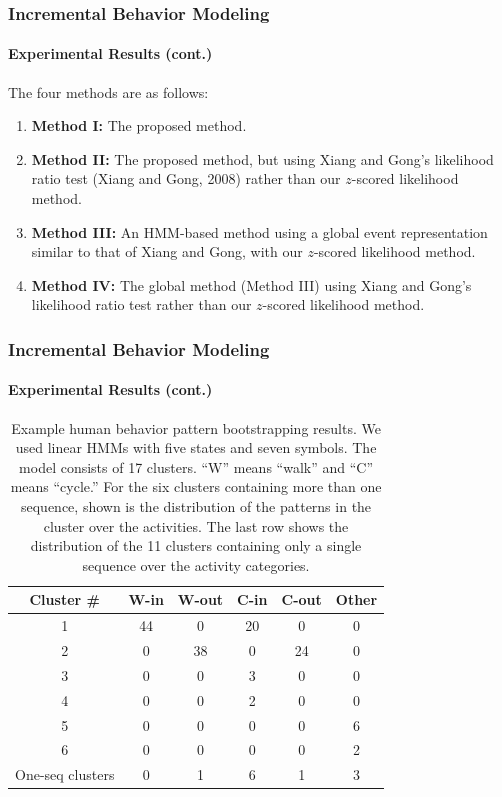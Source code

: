 \begin{frame}
    \frametitle{Incremental Behavior Modeling}
    \framesubtitle{Experimental Results (cont.)}
    
    The four methods are as follows:
    \begin{enumerate}
        \item {\bf Method I:} The proposed method.
        \item {\bf Method II:} The proposed method, but using Xiang and Gong's
            likelihood ratio test (Xiang and Gong, 2008)
            rather than our $z$-scored likelihood method.
        \item {\bf Method III:} An HMM-based method using a global event
            representation similar to that of Xiang and Gong, with our
            $z$-scored likelihood method.
        \item {\bf Method IV:} The global method (Method III) using Xiang and
            Gong's likelihood ratio test rather than our $z$-scored likelihood
            method.
    \end{enumerate}

\end{frame}


\begin{frame}
    \frametitle{Incremental Behavior Modeling}
    \framesubtitle{Experimental Results (cont.)}
    
    \begin{table}
        \caption{Example human behavior pattern bootstrapping
            results. We used linear HMMs with five states and seven
            symbols. The model consists of 17 clusters. ``W'' means ``walk''
            and ``C'' means ``cycle.'' For the six clusters containing more
            than one sequence, shown is the distribution of the patterns in
            the cluster over the activities.  The last row shows the
            distribution of the 11 clusters containing only a single sequence
            over the activity categories.}
        \centering
        \begin{tabular}{c|c|c|c|c|c}
            \hline
            Cluster \# & W-in & W-out & C-in & C-out & Other \\
            \hline \hline
            1 & 44 & 0  & 20 & 0  & 0 \\ \hline
            2 & 0  & 38 & 0  & 24 & 0 \\ \hline
            3 & 0  & 0  & 3  & 0  & 0 \\ \hline
            4 & 0  & 0  & 2  & 0  & 0 \\ \hline
            5 & 0  & 0  & 0  & 0  & 6 \\ \hline
            6 & 0  & 0  & 0  & 0  & 2 \\ \hline
            One-seq clusters & 0 & 1 & 6 & 1 & 3 \\ \hline
        \end{tabular}
        \label{tab:bootstrapping-results}
    \end{table}

\end{frame}


